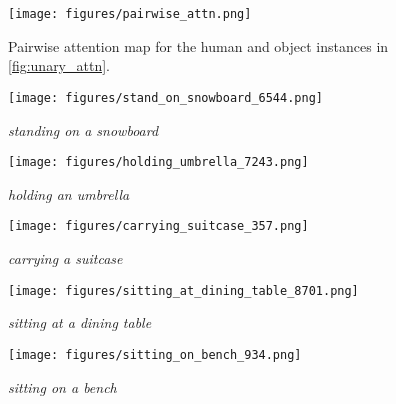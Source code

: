 \documentclass[10pt,twocolumn,letterpaper]{article}
\begin{document}
\begin{figure}[t]
    \centering
    \texttt{[image: figures/pairwise\_attn.png]}
    \caption{Pairwise attention map for the human and object instances in \cref{fig:unary_attn}.}
    \label{fig:pairwise_attn}
\end{figure}

\begin{figure*}[t]
    
    \begin{subfigure}[t]{0.19\linewidth}
        \centering
        \texttt{[image: figures/stand\_on\_snowboard\_6544.png]}
        \caption{\textit{standing on a snowboard}}
        \label{fig:standing-on-snowboard}
    \end{subfigure}
    \hfill \begin{subfigure}[t]{0.19\linewidth}
        \centering
        \texttt{[image: figures/holding\_umbrella\_7243.png]}
        \caption{\textit{holding an umbrella}}
        \label{fig:holding-umbrella}
    \end{subfigure}
    \hfill \begin{subfigure}[t]{0.19\linewidth}
        \centering
        \texttt{[image: figures/carrying\_suitcase\_357.png]}
        \caption{\textit{carrying a suitcase}}
        \label{fig:carrying-suitcase}
    \end{subfigure}
    \hfill \begin{subfigure}[t]{0.19\linewidth}
        \centering
        \texttt{[image: figures/sitting\_at\_dining\_table\_8701.png]}
        \caption{\textit{sitting at a dining table}}
        \label{fig:sitting-at-dinning-table}
    \end{subfigure}
    \hfill \begin{subfigure}[t]{0.19\linewidth}
        \centering
        \texttt{[image: figures/sitting\_on\_bench\_934.png]}
        \caption{\textit{sitting on a bench}}
        \label{fig:sitting-on-bench}
    \end{subfigure}
    

\end{figure*}
\end{document}
